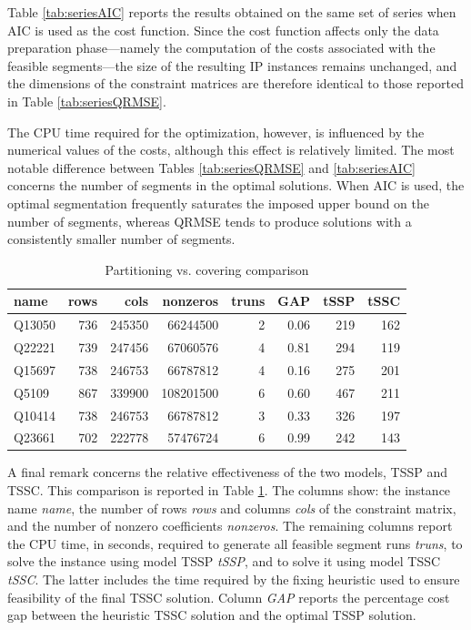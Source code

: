 \documentclass[preprints,article,submit,pdftex,moreauthors]{Definitions/mdpi}
\begin{document}
Table \ref{tab:seriesAIC} reports the results obtained on the same set of series when AIC is used as the cost function. Since the cost function affects only the data preparation phase—namely the computation of the costs associated with the feasible segments—the size of the resulting IP instances remains unchanged, and the dimensions of the constraint matrices are therefore identical to those reported in Table \ref{tab:seriesQRMSE}.

The CPU time required for the optimization, however, is influenced by the numerical values of the costs, although this effect is relatively limited. The most notable difference between Tables \ref{tab:seriesQRMSE} and \ref{tab:seriesAIC} concerns the number of segments in the optimal solutions. When AIC is used, the optimal segmentation frequently saturates the imposed upper bound on the number of segments, whereas QRMSE tends to produce solutions with a consistently smaller number of segments.

\begin{table}[ht]
	\centering
	\caption{Partitioning vs. covering comparison}\label{tab:SPP_SCP}%
	\begin{tabular}{@{}lrrrrrrr}
		\toprule
		name & rows & cols & nonzeros & truns & GAP & tSSP & tSSC \\
		\midrule
Q13050 & 736 & 245350 &  66244500 & 2 & 0.06 & 219 & 162 \\
Q22221 & 739 & 247456 &  67060576 & 4 & 0.81 & 294 & 119 \\
Q15697 & 738 & 246753 &  66787812 & 4 & 0.16 & 275 & 201 \\
Q5109  & 867 & 339900 & 108201500 & 6 & 0.60 & 467 & 211 \\
Q10414 & 738 & 246753 &  66787812 & 3 & 0.33 & 326 & 197 \\
Q23661 & 702 & 222778 &  57476724 & 6 & 0.99 & 242 & 143 \\
		\bottomrule
	\end{tabular}
\end{table}

A final remark concerns the relative effectiveness of the two models, TSSP and TSSC. This comparison is reported in Table \ref{tab:SPP_SCP}. The columns show: the instance name {\it name}, the number of rows {\it rows} and columns {\it cols} of the constraint matrix, and the number of nonzero coefficients {\it nonzeros}. The remaining columns report the CPU time, in seconds, required to generate all feasible segment runs {\it truns}, to solve the instance using model TSSP {\it tSSP}, and to solve it using model TSSC {\it tSSC}. The latter includes the time required by the fixing heuristic used to ensure feasibility of the final TSSC solution. Column {\it GAP} reports the percentage cost gap between the heuristic TSSC solution and the optimal TSSP solution.
\end{document}
